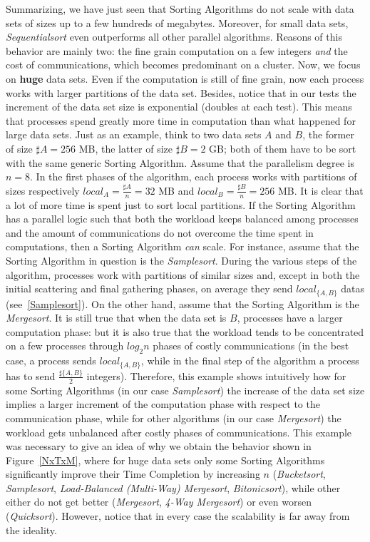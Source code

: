 Summarizing, we have just seen that Sorting Algorithms do not scale with data sets of sizes up to a few hundreds of megabytes. Moreover, for small data sets, \textit{Sequentialsort} even outperforms all other parallel algorithms. Reasons of this behavior are mainly two: the fine grain computation on a few integers \textit{and} the cost of communications, which becomes predominant on a cluster. Now, we focus on \textbf{huge} data sets. Even if the computation is still of fine grain, now each process works with larger partitions of the data set. Besides, notice that in our tests the increment of the data set size is exponential (doubles at each test). This means that processes spend greatly more time in computation than what happened for large data sets. Just as an example, think to two data sets $A$ and $B$, the former of size $\sharp A = 256$ MB, the latter of size $\sharp B = 2$ GB; both of them have to be sort with the same generic Sorting Algorithm. Assume that the parallelism degree is $n=8$. In the first phases of the algorithm, each process works with partitions of sizes respectively $local_A = \frac{\sharp A}{n} = 32$ MB and $local_B = \frac{\sharp B}{n} = 256$ MB. It is clear that a lot of more time is spent just to sort local partitions. If the Sorting Algorithm has a parallel logic such that both the workload keeps balanced among processes and the amount of communications do not overcome the time spent in computations, then a Sorting Algorithm \textit{can} scale. For instance, assume that the Sorting Algorithm in question is the \textit{Samplesort}. During the various steps of the algorithm, processes work with partitions of similar sizes and, except in both the initial scattering and final gathering phases, on average they send $local_{\lbrace A,B \rbrace}$ datas (see~\ref{Samplesort}). On the other hand, assume that the Sorting Algorithm is the \textit{Mergesort}. It is still true that when the data set is $B$, processes have a larger computation phase: but it is also true that the workload tends to be concentrated on a few processes through $log_2{n}$ phases of costly communications (in the best case, a process sends $local_{\lbrace A,B \rbrace}$, while in the final step of the algorithm a process has to send $\frac{\sharp\lbrace A,B\rbrace}{2}$ integers). Therefore, this example shows intuitively how for some Sorting Algorithms (in our case \textit{Samplesort}) the increase of the data set size implies a larger increment of the computation phase with respect to the communication phase, while for other algorithms (in our case \textit{Mergesort}) the workload gets unbalanced after costly phases of communications. This example was necessary to give an idea of why we obtain the behavior shown in Figure~\ref{NxTxM}, where for huge data sets only some Sorting Algorithms significantly improve their Time Completion by increasing $n$ (\textit{Bucketsort}, \textit{Samplesort}, \textit{Load-Balanced (Multi-Way) Mergesort}, \textit{Bitonicsort}), while other either do not get better (\textit{Mergesort}, \textit{4-Way Mergesort}) or even worsen (\textit{Quicksort}). However, notice that in every case the scalability is far away from the ideality. 

